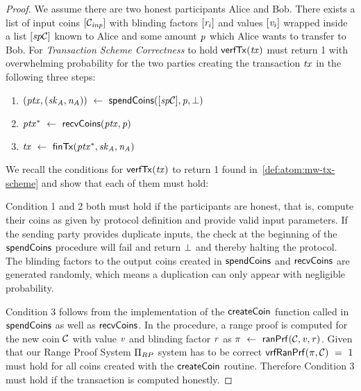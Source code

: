 \begin{proof}
    We assume there are two honest participants Alice and Bob.
    There exists a list of input coins $[\mathcal{C}_{\mathit{inp}}]$ with blinding factors $[\mathit{r}_i]$ and values $[\mathit{v}_i]$ wrapped inside a list $[\mathit{sp}\mathcal{C}]$ known to Alice and some amount $\mathit{p}$ which Alice wants to transfer to Bob.
    For \emph{Transaction Scheme Correctness} to hold $\mathsf{verfTx}(\mathit{tx})$ must return 1 with overwhelming probability for the two parties creating the transaction $\mathit{tx}$ in the following three steps:
    \begin{enumerate}
        \item $(\mathit{ptx}, (\mathit{sk}_{\mathit{A}}, \mathit{\mathit{n}_{\mathit{A}}})) ~\leftarrow~ \mathsf{spendCoins}([\mathit{sp}\mathcal{C}],\mathit{p},\bot)$
        \item $\mathit{ptx}^* ~\leftarrow~ \mathsf{recvCoins}(\mathit{ptx},\mathit{p})$
        \item $\mathit{tx} ~\leftarrow~ \mathsf{finTx}(\mathit{ptx}^*,\mathit{sk}_{\mathit{A}},\mathit{\mathit{n}_{\mathit{A}}})$
    \end{enumerate}
    We recall the conditions for $\mathsf{verfTx}(\mathit{tx})$ to return 1 found in~\cref{def:atom:mw-tx-scheme} and show that each of them must hold:

    Condition 1 and 2 both must hold if the participants are honest, that is, compute their coins as given by protocol definition and provide valid input parameters.
    If the sending party provides duplicate inputs, the check at the beginning of the $\mathsf{spendCoins}$ procedure will fail and return $\bot$ and thereby halting the protocol.
    The blinding factors to the output coins created in $\mathsf{spendCoins}$ and $\mathsf{recvCoins}$ are generated randomly, which means a duplication can only appear with negligible probability.

    Condition 3 follows from the implementation of the $\mathsf{createCoin}$ function called in $\mathsf{spendCoins}$ as well as $\mathsf{recvCoins}$.
    In the procedure, a range proof is computed for the new coin $\mathcal{C}$ with value $\mathit{v}$ and blinding factor $\mathit{r}$ as $\pi ~\leftarrow~ \mathsf{ranPrf}(\mathcal{C},\mathit{v},\mathit{r})$.
    Given that our Range Proof System $\Pi_{RP}$ system has to be correct $\mathsf{vrfRanPrf}(\pi,\mathcal{C}) ~=~ 1$ must hold for all coins created with the $\mathsf{createCoin}$ routine.
    Therefore Condition 3 must hold if the transaction is computed honestly.


\end{proof}
